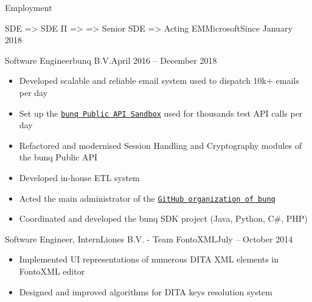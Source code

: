 \documentclass[calibri]{mcdowellcv}
\newcommand{\ultthref}[2]{\href{#1}{\underline{\texttt{#2}}}}
\begin{document}
\begin{cvsection}{Employment}
\begin{cvsubsection}[2]{SDE => SDE II => \linebreak => Senior SDE => Acting EM}{Microsoft}{Since January 2018}
\begin{itemize}
			\end{itemize}
		\end{cvsubsection}
		\begin{cvsubsection}{Software Engineer}{bunq B.V.}{April 2016 -- December 2018}			
			\begin{itemize}
				\item Developed scalable and reliable email system used to dispatch 10k+ emails per day
				\item Set up the \ultthref{https://doc.bunq.com}{bunq Public API Sandbox} used for thousands test API calls per day
				\item Refactored and modernised Session Handling and Cryptography modules of the bunq Public API
				\item Developed in-house ETL system
				\item Acted the main administrator of the \ultthref{https://github.com/bunq}{GitHub organization of bunq} 
				\item Coordinated and developed the bunq SDK project (Java, Python, C\#, PHP)
			\end{itemize}
		\end{cvsubsection}
		\begin{cvsubsection}{Software Engineer, Intern}{Liones B.V. - Team FontoXML}{July -- October 2014}
			\begin{itemize}
				\item Implemented UI representations of numerous DITA XML elements in FontoXML editor
				\item Designed and improved algorithms for DITA keys resolution system
			\end{itemize}
		\end{cvsubsection}
	\end{cvsection}
\end{document}

